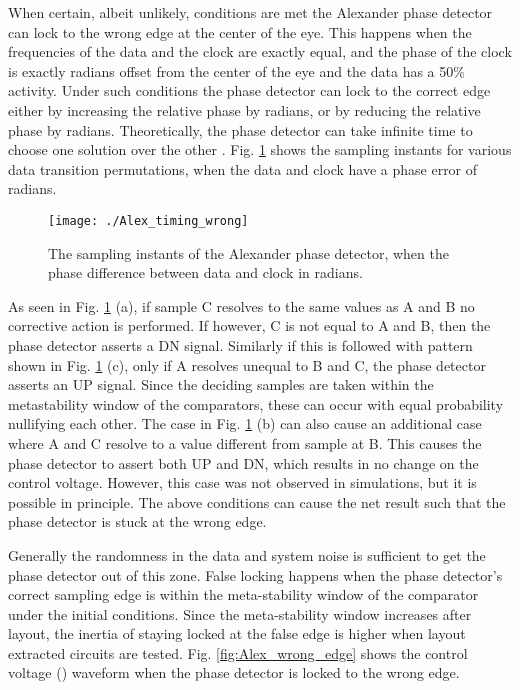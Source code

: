 \documentclass[journal,twoside,letterpaper]{IEEEtran}
\begin{document}
When certain, albeit unlikely, conditions are met the 
Alexander phase detector can lock to the
wrong edge at the center of the eye. This happens when 
the frequencies of the data and the clock 
are exactly equal, and the phase of the 
clock is exactly  radians offset from
the center of the eye and the data has a 50\% activity.
Under such conditions the phase detector
can lock to the correct edge either by increasing 
the relative phase by  radians,
or by reducing the relative phase by  radians. Theoretically, the 
phase detector can take infinite time to choose one solution over 
the other \cite{buridan}.
Fig. \ref{fig:Alex_sample_wrong} shows the sampling instants
for various data transition permutations, when the data
and clock have a phase error of  radians.
\begin{figure}[htb!]
\centering
\texttt{[image: ./Alex\_timing\_wrong]}
\caption{The sampling instants of the Alexander phase detector, when 
the phase difference between data and clock in  radians.}
\label{fig:Alex_sample_wrong}
\end{figure}
As seen in Fig. \ref{fig:Alex_sample_wrong} (a), if sample
C resolves to the same values as A and B no corrective action is performed.
If however, C is not equal to A and B, then the phase detector asserts
a DN signal. Similarly if this is followed with pattern shown in 
Fig. \ref{fig:Alex_sample_wrong} (c), only if A resolves unequal to 
B and C, the phase detector asserts an UP signal. Since the deciding samples
are taken within the metastability window of the comparators, these can
occur with equal probability nullifying each other. The case in 
Fig. \ref{fig:Alex_sample_wrong} (b) can also cause an additional
case where A and C resolve to a value different from sample at B.
This causes the phase detector to assert both UP and DN, which
results in no change on the control voltage. However, this case
was not observed in simulations, but it is possible in principle.
The above conditions can cause the net result such
that the phase detector is stuck at the wrong edge.

Generally the randomness in the data and system noise is sufficient to 
get the phase detector out of this zone.
False locking happens when the phase detector's correct sampling edge is within the
meta-stability window of the comparator under the initial conditions. Since the
meta-stability window increases after layout, the inertia of staying locked at the false
edge is higher when layout extracted circuits are tested. Fig. \ref{fig:Alex_wrong_edge} shows
the control voltage () waveform when the phase detector is locked to the wrong edge. 
\end{document}
